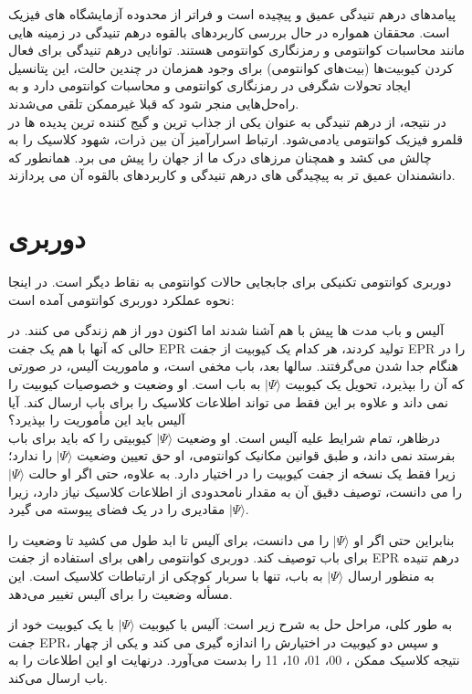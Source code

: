 \documentclass{book}
\begin{document}
پیامدهای درهم تنیدگی عمیق و پیچیده است و فراتر از محدوده آزمایشگاه های فیزیک است. محققان همواره در حال بررسی کاربردهای بالقوه درهم تنیدگی در زمینه هایی مانند محاسبات کوانتومی و رمزنگاری کوانتومی هستند. توانایی درهم تنیدگی برای فعال کردن کیوبیت‌ها (بیت‌های کوانتومی) برای وجود همزمان در چندین حالت، این پتانسیل ایجاد تحولات شگرفی در رمزنگاری کوانتومی و محاسبات کوانتومی دارد و به راه‌حل‌هایی منجر شود که قبلا غیرممکن تلقی می‌شدند.\\

در نتیجه، از درهم تنیدگی به عنوان یکی از جذاب ترین و گیج کننده ترین پدیده ها در قلمرو فیزیک کوانتومی یاد‌می‌شود. ارتباط اسرارآمیز آن بین ذرات، شهود کلاسیک را به چالش می کشد و همچنان مرزهای درک ما از جهان را پیش می برد. همانطور که دانشمندان عمیق تر به پیچیدگی های درهم تنیدگی و کاربردهای بالقوه آن می پردازند.

\section{دوربری}
دوربری کوانتومی تکنیکی برای جابجایی حالات کوانتومی به نقاط دیگر است. در اینجا نحوه عملکرد دوربری کوانتومی آمده است:

 آلیس و باب مدت ها پیش با هم آشنا شدند اما اکنون دور از هم زندگی می کنند. در حالی که آنها با هم یک جفت EPR تولید کردند، هر کدام یک کیوبیت از جفت EPR را در هنگام جدا شدن می‌گرفتند. سالها بعد، باب مخفی است، و ماموریت آلیس، در صورتی که آن را بپذیرد، تحویل یک کیوبیت $\vert \Psi \rangle$ به باب است. او وضعیت  و خصوصیات کیوبیت را نمی داند و علاوه بر این فقط می تواند اطلاعات کلاسیک را برای باب ارسال کند. آیا آلیس باید این مأموریت را بپذیرد؟\\


درظاهر، تمام شرایط علیه آلیس است. او وضعیت $\vert \Psi \rangle$ کیوبیتی را که باید برای باب بفرستد نمی داند، و طبق قوانین مکانیک کوانتومی، او حق تعیین وضعیت $\vert \Psi \rangle$ را ندارد؛‌زیرا فقط یک نسخه از جفت کیوبیت را در اختیار دارد. به علاوه، حتی اگر او حالت $\vert \Psi \rangle$ را می دانست، توصیف دقیق آن به مقدار نامحدودی از اطلاعات کلاسیک نیاز دارد، زیرا $\vert \Psi \rangle$ مقادیری را در یک فضای پیوسته می گیرد.

بنابراین حتی اگر او $\vert \Psi \rangle$ را می دانست، برای آلیس تا ابد طول می کشید تا وضعیت را برای باب توصیف کند. دوربری کوانتومی راهی برای استفاده از جفت EPR درهم تنیده به منظور ارسال $\vert \Psi \rangle$ به باب، تنها با سربار کوچکی از ارتباطات کلاسیک است. این مسأله وضعیت را برای آلیس تغییر می‌دهد.

به طور کلی، مراحل حل به شرح زیر است: آلیس با کیوبیت $\vert \Psi \rangle$ با یک کیوبیت خود از جفت EPR، و سپس دو کیوبیت در اختیارش را اندازه گیری می کند و یکی از چهار نتیجه کلاسیک ممکن
، 00، 01، 10، 11 را بدست می‌آورد. درنهایت او این اطلاعات را به باب ارسال می‌کند.
\end{document}
